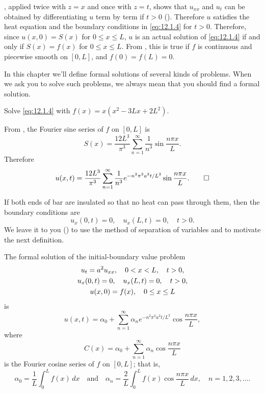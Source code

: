 , applied twice with
 $z=x$ and once with  $z=t$, shows that   $u_{xx}$  and $u_t$
can be obtained by differentiating $u$ term by term if $t>0$
 (). Therefore $u$
satisfies the heat equation
and the boundary
conditions in \eqref{eq:12.1.4} for $t>0$.
 Therefore, since $u(x,0)=S(x)$ for $0\le x\le
L$, $u$ is an actual solution of \eqref{eq:12.1.4} if and only if
$S(x)=f(x)$ for $0\le x\le L$. From , this
is true if
$f$ is continuous and piecewise smooth on $[0,L]$,
and $f(0)=f(L)=0$.

In this chapter we'll define formal solutions of
several kinds of  problems.
 When we ask you
to solve such  problems, we always mean that you should find a
formal solution.

\begin{example}\label{example:12.1.1}
Solve \eqref{eq:12.1.4} with
$f(x)=x(x^2-3Lx+2L^2)$.
\end{example}

\begin{solution}
From  , the Fourier
sine series of
$f$ on $[0,L]$ is
\[
S(x)=\frac{12L^3}{\pi^3}\sum_{n=1}^\infty\frac{1}{n^3}
\sin\frac{n\pi x}{L}.
\]
Therefore
\[
u(x,t)=\frac{12L^3}{\pi^3}\sum_{n=1}^\infty\frac{1}{n^3}
e^{-n^2\pi^2a^2t/L^2}\sin\frac{n\pi x}{L}.\qedhere
\]
\end{solution}

If both ends of bar are insulated so that no heat can pass
through them, then
the boundary conditions  are
\[
u_x(0,t)=0,\quad u_x(L,t)=0,\quad t>0.
\]
We leave it to you ()
to use the method of separation of variables and
 to motivate the next definition.


\begin{definition}\label{thmtype:12.1.3}
 The formal solution of the initial-boundary value problem
\begin{gather}
u_t=a^2u_{xx},\quad 0<x<L,\quad t>0,\notag\\
u_x(0,t)=0,\quad u_x(L,t)=0, \quad t>0,\label{eq:12.1.6}\\
u(x,0)=f(x),\quad 0\le x\le L\notag
\end{gather}
is
\[
u(x,t)=\alpha_0+\sum_{n=1}^\infty \alpha_ne^{-n^2\pi^2
a^2t/L^2}\cos\frac{n\pi x}{L},
\]
where
\[
C(x)=\alpha_0+\sum_{n=1}^\infty \alpha_n\cos\frac{n\pi x}{L}
\]
is the Fourier cosine series of $f$ on $[0,L]$; that is,
\[
\alpha_0=\frac{1}{L}\int_0^Lf(x)\,dx
\quad\text{and}\quad
\alpha_n=\frac{2}{L}\int_0^Lf(x)\cos\frac{n\pi x}{L}\,dx,\quad
n=1,2,3,\dots.
\]
\end{definition}



